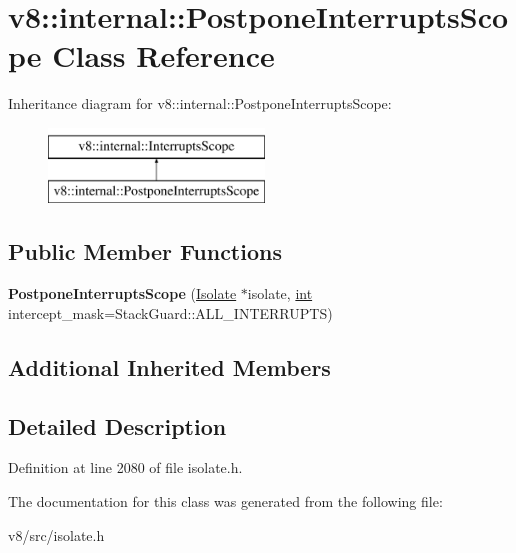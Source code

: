 \hypertarget{classv8_1_1internal_1_1PostponeInterruptsScope}{}\section{v8\+:\+:internal\+:\+:Postpone\+Interrupts\+Scope Class Reference}
\label{classv8_1_1internal_1_1PostponeInterruptsScope}
Inheritance diagram for v8\+:\+:internal\+:\+:Postpone\+Interrupts\+Scope\+:\begin{figure}[H]
\begin{center}
\leavevmode
\includegraphics[height=2.000000cm]{classv8_1_1internal_1_1PostponeInterruptsScope}
\end{center}
\end{figure}
\subsection*{Public Member Functions}
\begin{DoxyCompactItemize}
\item 
\mbox{\label{classv8_1_1internal_1_1PostponeInterruptsScope_a0d0ddd13679a488d8acc1f1b5743f252}} 
{\bfseries Postpone\+Interrupts\+Scope} (\mbox{\hyperlink{classv8_1_1internal_1_1Isolate}{Isolate}} $\ast$isolate, \mbox{\hyperlink{classint}{int}} intercept\+\_\+mask=Stack\+Guard\+::\+A\+L\+L\+\_\+\+I\+N\+T\+E\+R\+R\+U\+P\+TS)
\end{DoxyCompactItemize}
\subsection*{Additional Inherited Members}


\subsection{Detailed Description}


Definition at line 2080 of file isolate.\+h.



The documentation for this class was generated from the following file\+:\begin{DoxyCompactItemize}
\item 
v8/src/isolate.\+h\end{DoxyCompactItemize}
